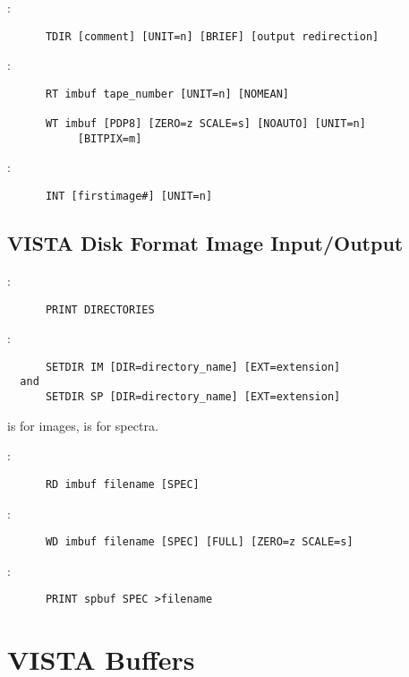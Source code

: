 \noindent {}:
\begin{verbatim}
      TDIR [comment] [UNIT=n] [BRIEF] [output redirection]
\end{verbatim}

\noindent {}:
\begin{verbatim}
      RT imbuf tape_number [UNIT=n] [NOMEAN]

      WT imbuf [PDP8] [ZERO=z SCALE=s] [NOAUTO] [UNIT=n]
	       [BITPIX=m]
\end{verbatim}

\noindent {}:
\begin{verbatim}
      INT [firstimage#] [UNIT=n]
\end{verbatim}

\subsection{VISTA Disk Format Image Input/Output}

:
\begin{verbatim}
      PRINT DIRECTORIES
\end{verbatim}

:
\begin{verbatim}
      SETDIR IM [DIR=directory_name] [EXT=extension]
  and
      SETDIR SP [DIR=directory_name] [EXT=extension]
\end{verbatim}
 is for images,  is for spectra.

\noindent {}:
\begin{verbatim}
      RD imbuf filename [SPEC]
\end{verbatim}

\noindent {}:
\begin{verbatim}
      WD imbuf filename [SPEC] [FULL] [ZERO=z SCALE=s]
\end{verbatim}

\noindent {}:
\begin{verbatim}
      PRINT spbuf SPEC >filename
\end{verbatim}


\section{VISTA Buffers}

